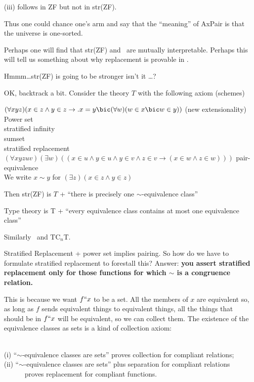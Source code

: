 \documentclass[12pt]{article}
\begin{document}
{(iii) follows in ZF but not in str(ZF).

Thus one could chance one's arm and say that the ``meaning'' of AxPair
is that the universe is one-sorted.

\bigskip

Perhaps one will find that str(ZF) and \TZT\ are mutually interpretable.
Perhaps this will tell us something about why replacement is provable in \TZT.

Hmmm\ldots str(ZF) is going to be stronger isn't it \ldots?

\bigskip

OK, backtrack a bit.  Consider the theory $T$ with the following axiom (schemes)

$(\forall xyz)(x\in z\wedge y\in z\to. x=y\bic(\forall w)(w\in x\bic w\in y))$ (new extensionality)\\
Power set\\
stratified infinity\\
sumset\\
stratified replacement\\
$(\forall x y z u v)(\exists w)((x \in u \wedge y \in u \wedge y \in v \wedge z \in v \to (x \in w \wedge z \in w)))$ pair-equivalence\\


We write $x \sim y$ for $(\exists z)(x \in z \wedge y \in z)$

Then str(ZF) is $T$ + ``there is precisely one $\sim$-equivalence class''

Type theory is T + ``every equivalence class contains at most one equivalence class''

Similarly \TZT\ and TC$_n$T.

\label{finax}


Stratified Replacement + power set implies pairing.  So how do we 
have to formulate stratified replacement to forestall this?  Answer: 
{\bf you assert stratified replacement only for those functions for which
$\sim$ is a congruence relation.  }

This is because we want $f``x$ to be a set.  All the members of $x$ are
equivalent so, as long as $f$ sends equivalent things to equivalent
things, all the things that should be in $f``x$ will be equivalent, so
we can collect them.  The existence of the equivalence classes as sets
is a kind of collection axiom:

\begin{rem}\mbox{\negthinspace}\\
(i) ``$\sim$-equivalence classes are sets'' proves collection for
  compliant relations;\\
(ii) ``$\sim$-equivalence classes are sets'' plus separation for compliant
  relations\\ \mbox{\, \, \, \, } proves replacement for compliant functions.
\end{rem}

}
\end{document}
